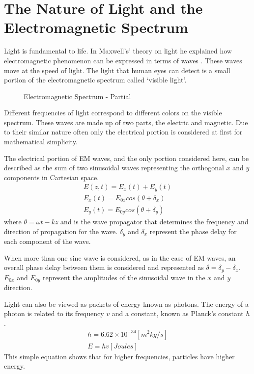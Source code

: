 \section{The Nature of Light and the Electromagnetic Spectrum}
Light is fundamental to life.  In Maxwell’s’ theory on light he explained how electromagnetic phenomenon can be expressed in terms of waves \cite{maxwell}.  These waves move at the speed of light.  The light that human eyes can detect is a small portion of the electromagnetic spectrum called ‘visible light’.
%
\begin{figure}[!htb]
    \begin{center}
    \end{center}
    \caption{Electromagnetic Spectrum - Partial}
    \label{fig:polarization}
\end{figure}
Different frequencies of light correspond to different colors on the visible spectrum.  These waves are made up of two parts, the electric and magnetic.  Due to their similar nature often only the electrical portion is considered at first for mathematical simplicity.

The electrical portion of EM waves, and the only portion considered here, can be described as the sum of two sinusoidal waves representing the orthogonal $x$ and $y$ components in Cartesian space.
%
\begin{align}
    E(z,t)=E_x (t)+E_y (t)\\
    E_x (t)=E_{0x} cos( \theta+\delta_x )\\
    E_y (t)=E_{0y} cos( \theta+\delta_y )
\end{align}
%
where $ \theta = \omega t-kz $ and is the wave propagator that determines the frequency and direction of propagation for the wave. $\delta_y$ and $\delta_x $ represent the phase delay for each component of the wave.

When more than one sine wave is considered, as in the case of EM waves, an overall phase delay between them is considered and represented as $ \delta=\delta_y-\delta_x $. $E_{0x}$ and $E_{0y}$ represent the amplitudes of the sinusoidal wave in the $x$ and $y$ direction.

Light can also be viewed as packets of energy known as photons.  The energy of a photon is related to its frequency $v$ and a constant, known as Planck’s constant $h$ \cite{ecophysiology}.
%
\begin{align}
	h=6.62\times10^{-34} [m^2 kg/s]\\
	E=hv [Joules]
\end{align}
%
This simple equation shows that for higher frequencies, particles have higher energy.

